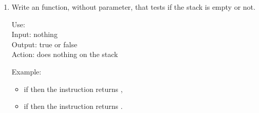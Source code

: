 \documentclass[11pt,class=report,crop=false]{standalone}
\begin{document}
\begin{activite}
\begin{enumerate}
  \item Write an  function, without parameter, that tests if the stack is empty or not. 
  
  \begin{fonction}
  Use:  \\
  Input: nothing \\
  Output: true or false \\
  Action: does nothing on the stack
  
  \medskip
    
  Example: 
  \begin{itemize}
    \item if  then the instruction  returns ,
    \item if  then the instruction  returns .
  \end{itemize}
  \end{fonction}
\end{enumerate} 
\end{activite}




\end{document}
